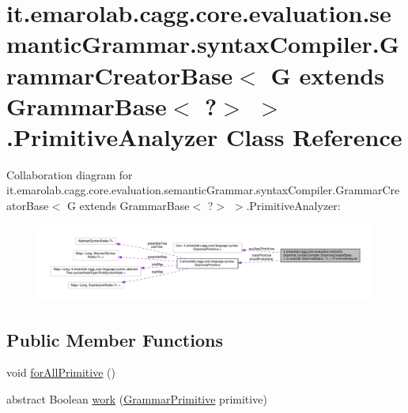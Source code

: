 \hypertarget{classit_1_1emarolab_1_1cagg_1_1core_1_1evaluation_1_1semanticGrammar_1_1syntaxCompiler_1_1Gramma476c64fc54be5b96aaf6048986cec760}{\section{it.\-emarolab.\-cagg.\-core.\-evaluation.\-semantic\-Grammar.\-syntax\-Compiler.\-Grammar\-Creator\-Base$<$ G extends Grammar\-Base$<$ ?$>$ $>$.Primitive\-Analyzer Class Reference}
\label{classit_1_1emarolab_1_1cagg_1_1core_1_1evaluation_1_1semanticGrammar_1_1syntaxCompiler_1_1Gramma476c64fc54be5b96aaf6048986cec760}
}


Collaboration diagram for it.\-emarolab.\-cagg.\-core.\-evaluation.\-semantic\-Grammar.\-syntax\-Compiler.\-Grammar\-Creator\-Base$<$ G extends Grammar\-Base$<$ ?$>$ $>$.Primitive\-Analyzer\-:\nopagebreak
\begin{figure}[H]
\begin{center}
\leavevmode
\includegraphics[width=350pt]{classit_1_1emarolab_1_1cagg_1_1core_1_1evaluation_1_1semanticGrammar_1_1syntaxCompiler_1_1Grammabdf5c1276e8155b18b7ee32ec99416d9}
\end{center}
\end{figure}
\subsection*{Public Member Functions}
\begin{DoxyCompactItemize}
\item 
void \hyperlink{classit_1_1emarolab_1_1cagg_1_1core_1_1evaluation_1_1semanticGrammar_1_1syntaxCompiler_1_1Gramma476c64fc54be5b96aaf6048986cec760_a9a3164919944182861770934a61e7eb5}{for\-All\-Primitive} ()
\item 
abstract Boolean \hyperlink{classit_1_1emarolab_1_1cagg_1_1core_1_1evaluation_1_1semanticGrammar_1_1syntaxCompiler_1_1Gramma476c64fc54be5b96aaf6048986cec760_a8f614a9aa1cf1ab76255f31ec095e477}{work} (\hyperlink{classit_1_1emarolab_1_1cagg_1_1core_1_1language_1_1syntax_1_1GrammarPrimitive}{Grammar\-Primitive} primitive)
\end{DoxyCompactItemize}
